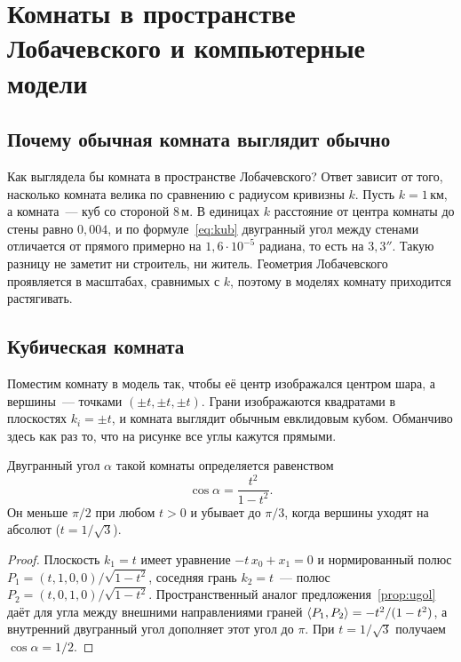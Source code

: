 \section{Комнаты в пространстве Лобачевского и компьютерные модели}

\subsection{Почему обычная комната выглядит обычно}

Как выглядела бы комната в пространстве Лобачевского? Ответ зависит от того, насколько комната велика по сравнению с радиусом кривизны $k$. Пусть $k=1$\,км, а комната~--- куб со стороной 8\,м. В единицах $k$ расстояние от центра комнаты до стены равно $0{,}004$, и по формуле~\eqref{eq:kub} двугранный угол между стенами отличается от прямого примерно на $1{,}6\cdot10^{-5}$ радиана, то есть на $3{,}3''$. Такую разницу не заметит ни строитель, ни житель. Геометрия Лобачевского проявляется в масштабах, сравнимых с $k$, поэтому в моделях комнату приходится растягивать.

\subsection{Кубическая комната}

Поместим комнату в модель так, чтобы её центр изображался центром шара, а вершины~--- точками $(\pm t,\pm t,\pm t)$. Грани изображаются квадратами в плоскостях $k_i=\pm t$, и комната выглядит обычным евклидовым кубом. Обманчиво здесь как раз то, что на рисунке все углы кажутся прямыми.

\begin{theorem}\label{thm:kub}
Двугранный угол $\alpha$ такой комнаты определяется равенством
\begin{equation}\label{eq:kub}
\cos\alpha=\frac{t^2}{1-t^2}.
\end{equation}
Он меньше $\pi/2$ при любом $t>0$ и убывает до $\pi/3$, когда вершины уходят на абсолют ($t=1/\sqrt3$).
\end{theorem}
\begin{proof}
Плоскость $k_1=t$ имеет уравнение $-t\,x_0+x_1=0$ и нормированный полюс $P_1=(t,1,0,0)/\sqrt{1-t^2}$, соседняя грань $k_2=t$~--- полюс $P_2=(t,0,1,0)/\sqrt{1-t^2}$. Пространственный аналог предложения~\ref{prop:ugol} даёт для угла между внешними направлениями граней $\langle P_1,P_2\rangle=-t^2/(1-t^2)$, а внутренний двугранный угол дополняет этот угол до $\pi$. При $t=1/\sqrt3$ получаем $\cos\alpha=1/2$.
\end{proof}

